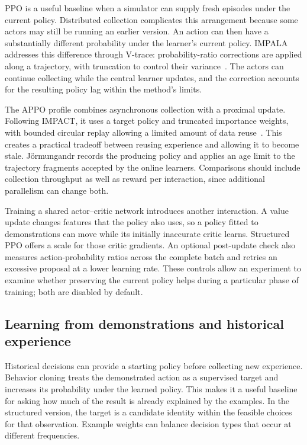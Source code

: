 \documentclass{strategynet-journal}
\begin{document}
PPO is a useful baseline when a simulator can supply fresh episodes under the
current policy. Distributed collection complicates this arrangement because
some actors may still be running an earlier version. An action can then have
a substantially different probability under the learner's current policy.
IMPALA addresses this difference through V-trace: probability-ratio corrections
are applied along a trajectory, with truncation to control their variance~\cite{impala}.
The actors can continue collecting while the central learner updates, and the
correction accounts for the resulting policy lag within the method's limits.

The APPO profile combines asynchronous collection with a proximal update.
Following IMPACT, it uses a target policy and truncated importance weights,
with bounded circular replay allowing a limited amount of data reuse~\cite{impact}.
This creates a practical tradeoff between reusing experience and allowing it
to become stale. Jörmungandr records the producing policy and applies an age
limit to the trajectory fragments accepted by the online learners. Comparisons
should include collection throughput as well as reward per interaction,
since additional parallelism can change both.

Training a shared actor--critic network introduces another interaction. A
value update changes features that the policy also uses, so a policy fitted
to demonstrations can move while its initially inaccurate critic learns.
Structured PPO offers a scale for those critic gradients. An optional
post-update check also measures action-probability ratios across the complete
batch and retries an excessive proposal at a lower learning rate. These
controls allow an experiment to examine whether preserving the current policy
helps during a particular phase of training; both are disabled by default.

\subsection{Learning from demonstrations and historical experience}

Historical decisions can provide a starting policy before collecting new
experience. Behavior cloning treats the demonstrated action as a supervised
target and increases its probability under the learned policy. This makes it
a useful baseline for asking how much of the result is already explained by
the examples. In the structured version, the target is a candidate identity
within the feasible choices for that observation. Example weights can balance
decision types that occur at different frequencies.
\end{document}
